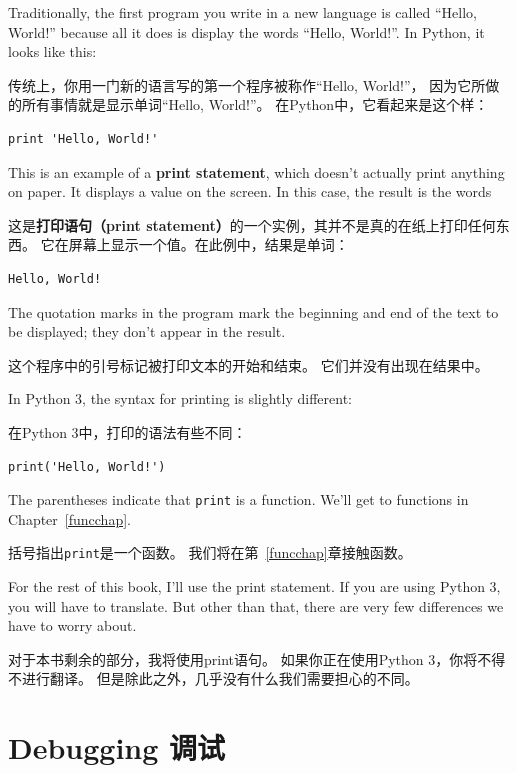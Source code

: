 \documentclass[10pt]{book}
\begin{document}
\begin{CJK}{UTF8}{gbsn}
Traditionally, the first program you write in a new language
is called ``Hello, World!'' because all it does is display the
words ``Hello, World!''.  In Python, it looks like this:

传统上，你用一门新的语言写的第一个程序被称作``Hello, World!''，
因为它所做的所有事情就是显示单词``Hello, World!''。
在Python中，它看起来是这个样：

\begin{verbatim}
print 'Hello, World!'
\end{verbatim}
%
This is an example of a {\bf print statement}, which
doesn't actually print anything on paper.  It displays a value on the
screen.  In this case, the result is the words

这是{\bf 打印语句（print statement）}的一个实例，其并不是真的在纸上打印任何东西。
它在屏幕上显示一个值。在此例中，结果是单词：

\begin{verbatim}
Hello, World!
\end{verbatim}
%
The quotation marks in the program mark the beginning and end
of the text to be displayed; they don't appear in the result.

这个程序中的引号标记被打印文本的开始和结束。
它们并没有出现在结果中。

In Python 3, the syntax for printing is slightly different:

在Python 3中，打印的语法有些不同：

\begin{verbatim}
print('Hello, World!')
\end{verbatim}
%
The parentheses indicate that {\tt print} is a function.  We'll get
to functions in Chapter~\ref{funcchap}.
  

括号指出{\tt print}是一个函数。
我们将在第~\ref{funcchap}章接触函数。

For the rest of this book, I'll use the print statement.  If you
are using Python 3, you will have to translate.  But other than
that, there are very few differences we have to worry about.

对于本书剩余的部分，我将使用print语句。
如果你正在使用Python 3，你将不得不进行翻译。
但是除此之外，几乎没有什么我们需要担心的不同。

\section{Debugging 调试}


\end{CJK}
\end{document}
